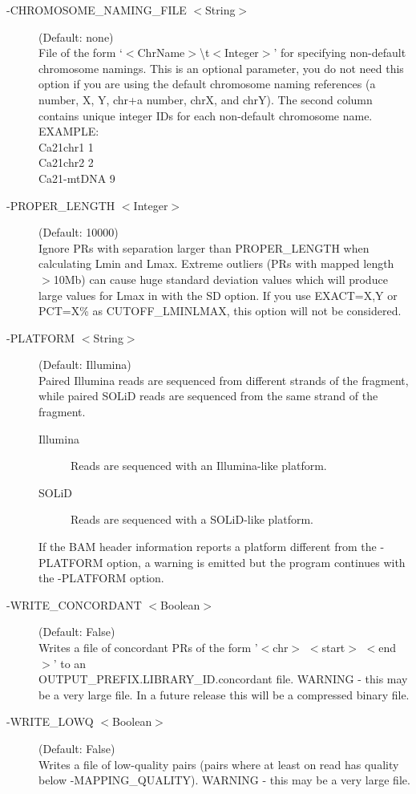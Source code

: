 \documentclass[11pt]{article}
\begin{document}
\begin{description}
\item[-CHROMOSOME\_NAMING\_FILE $<$String$>$] (Default: none)\\
File of the form `$<$ChrName$>$\textbackslash t$<$Integer$>$' for specifying non-default chromosome namings.  This is an optional parameter, you do not need this option if you are using the default chromosome naming references (a number, X, Y, chr+a number, chrX, and chrY).  The second column contains unique integer IDs for each non-default chromosome name.\\
\noindent EXAMPLE: \\
\noindent Ca21chr1        1 \\ 
\noindent Ca21chr2        2 \\
\noindent Ca21-mtDNA      9 

\item[-PROPER\_LENGTH $<$Integer$>$] (Default: 10000)\\
Ignore PRs with separation larger than PROPER\_LENGTH when calculating Lmin and Lmax. Extreme outliers (PRs with mapped length $>$10Mb) can cause huge standard deviation values which will produce large values for Lmax in with the SD option. 
If you use EXACT=X,Y or PCT=X\% as CUTOFF\_LMINLMAX, this option will not be considered.

\item[-PLATFORM $<$String$>$] (Default: Illumina)\\
Paired Illumina reads are sequenced from different strands of the fragment, while paired SOLiD reads are sequenced from the same strand of the fragment.  
\begin{description}
\item[Illumina] Reads are sequenced with an Illumina-like platform.
\item[SOLiD] Reads are sequenced with a SOLiD-like platform. 
\end{description}
If the BAM header information reports a platform different from the -PLATFORM option, a warning is emitted but the program continues with the -PLATFORM option.

\item[-WRITE\_CONCORDANT $<$Boolean$>$] (Default: False)\\
Writes a file of concordant PRs of the form '$<$chr$>$ $<$start$>$ $<$end$>$' to an  \\ OUTPUT\_PREFIX.LIBRARY\_ID.concordant file.  WARNING - this may be a very large file.  In a future release this will be a compressed binary file.

\item[-WRITE\_LOWQ $<$Boolean$>$](Default: False)\\
Writes a file of low-quality pairs (pairs where at least on read has quality below -MAPPING\_QUALITY).  WARNING - this may be a very large file.


\end{description}
\end{document}
